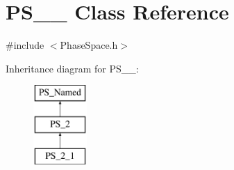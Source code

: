 \hypertarget{classPS__2__1}{}\section{P\+S\+\_\+\_ Class Reference}
\label{classPS__2__1}


{\ttfamily \#include $<$Phase\+Space.\+h$>$}

Inheritance diagram for P\+S\+\_\+\_\+:\begin{figure}[H]
\begin{center}
\leavevmode
\includegraphics[height=3.000000cm]{classPS__2__1}
\end{center}
\end{figure}
